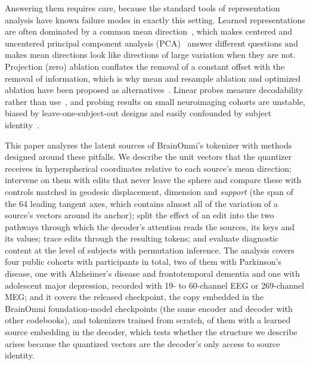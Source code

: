 \documentclass[10pt,letterpaper]{article}
\begin{document}
Answering them requires care, because the standard tools of representation analysis
have known failure modes in exactly this setting. Learned representations are often
dominated by a common mean direction~\cite{mu2018allbutthetop,ethayarajh2019contextual,
gao2019degeneration,bis2021toomuch}, which makes centered and uncentered principal
component analysis (PCA)~\cite{jolliffe2016pca} answer different questions and makes
mean directions look like directions of large variation when they are not. Projection (zero) ablation conflates the removal of a constant offset with the
removal of information, which is why mean and resample ablation and optimized
ablation have been proposed as alternatives~\cite{chan2022causalscrubbing,heimersheim2024patching,zhang2024bestpractices,
li2024optimalablation}. Linear probes measure decodability rather than use~\cite{hewitt2019probes,belinkov2022probing,elazar2021amnesic}, and probing results
on small neuroimaging cohorts are unstable, biased by leave-one-subject-out designs
and easily confounded by subject identity~\cite{varoquaux2018cvfailure,airola2011auc,saeb2017usecase,lin2026identitytrap}.

This paper analyzes the latent sources of BrainOmni's tokenizer with methods designed
around these pitfalls. We describe the unit vectors that the quantizer receives in
hyperspherical coordinates relative to each source's mean direction; intervene on them with
edits that never leave the sphere and compare these with controls matched in geodesic
displacement, dimension and \emph{support} (the span of the 64 leading tangent axes, which contains
almost all of the variation of a source's vectors around its anchor); split the effect of an edit into the two pathways through which
the decoder's attention reads the sources, its keys and its values; trace edits through the
resulting tokens; and evaluate diagnostic content at the level of subjects with permutation
inference. The analysis covers four public cohorts with \NsubjTotal{} participants in total, two
of them with Parkinson's disease, one with Alzheimer's disease and frontotemporal dementia and
one with adolescent major depression, recorded with 19- to 60-channel EEG or 269-channel MEG;
and it covers the released checkpoint, the copy embedded in the BrainOmni foundation-model
checkpoints (the same encoder and decoder with other codebooks), and \NumReplicas{} tokenizers
trained from scratch, \NumVariants{} of them with a learned source embedding in the decoder, which tests
whether the structure we describe arises because the quantized vectors are the decoder's only access
to source identity.
\end{document}
